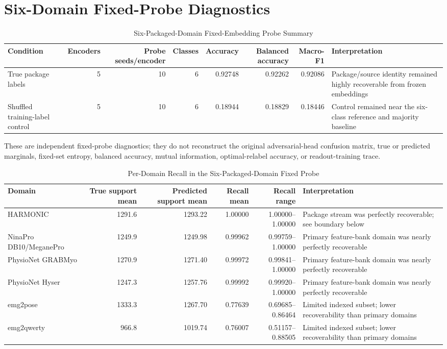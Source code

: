 \documentclass[journal]{IEEEtran}
\begin{document}
\section{Six-Domain Fixed-Probe Diagnostics}

\begin{table}[!t]
\caption{Six-Packaged-Domain Fixed-Embedding Probe Summary}
\label{tab:s_sixdomainprobe}
\centering
\footnotesize
\begin{tabularx}{\textwidth}{@{}lrrrrrrY@{}}
\toprule
Condition & Encoders & Probe seeds/encoder & Classes & Accuracy & Balanced accuracy & Macro-F1 & Interpretation \\
\midrule
True package labels & 5 & 10 & 6 & 0.92748 & 0.92262 & 0.92086 & Package/source identity remained highly recoverable from frozen embeddings \\
Shuffled training-label control & 5 & 10 & 6 & 0.18944 & 0.18829 & 0.18446 & Control remained near the six-class reference and majority baseline \\
\bottomrule
\end{tabularx}
\end{table}

These are independent fixed-probe diagnostics; they do not reconstruct the original adversarial-head confusion matrix, true or predicted marginals, fixed-set entropy, balanced accuracy, mutual information, optimal-relabel accuracy, or readout-training trace.

\begin{table}[!t]
\caption{Per-Domain Recall in the Six-Packaged-Domain Fixed Probe}
\label{tab:s_sixdomainrecall}
\centering
\footnotesize
\begin{tabularx}{\textwidth}{@{}lrrrrY@{}}
\toprule
Domain & True support mean & Predicted support mean & Recall mean & Recall range & Interpretation \\
\midrule
HARMONIC & 1291.6 & 1293.22 & 1.00000 & 1.00000--1.00000 & Package stream was perfectly recoverable; see boundary below \\
NinaPro DB10/MeganePro & 1249.9 & 1249.98 & 0.99962 & 0.99759--1.00000 & Primary feature-bank domain was nearly perfectly recoverable \\
PhysioNet GRABMyo & 1270.9 & 1271.40 & 0.99972 & 0.99841--1.00000 & Primary feature-bank domain was nearly perfectly recoverable \\
PhysioNet Hyser & 1247.3 & 1257.76 & 0.99992 & 0.99920--1.00000 & Primary feature-bank domain was nearly perfectly recoverable \\
emg2pose & 1333.3 & 1267.70 & 0.77639 & 0.69685--0.86464 & Limited indexed subset; lower recoverability than primary domains \\
emg2qwerty & 966.8 & 1019.74 & 0.76007 & 0.51157--0.88505 & Limited indexed subset; lower recoverability than primary domains \\
\bottomrule
\end{tabularx}
\end{table}
\end{document}
